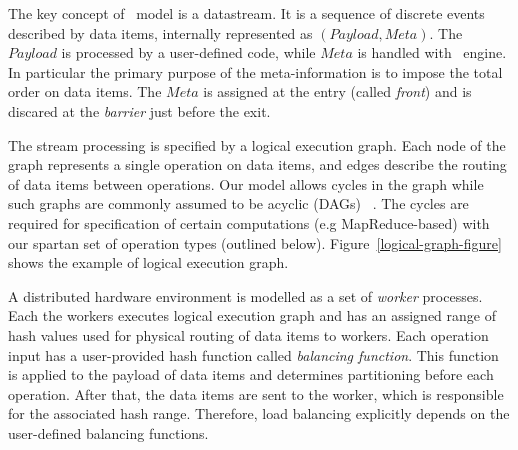 
\label {fs-model}

The key concept of \FlameStream\ model is a datastream. It is a sequence of discrete events described by data items, internally represented as 
$(Payload, Meta).$
The $Payload$ is processed by a user-defined code, while $Meta$ is handled with \FlameStream\ engine. In particular
the primary purpose of the meta-information is to impose the total order on data items. 
The  $Meta$ is assigned at the entry (called {\em  front}) and is discared at the {\em barrier} just before the exit. 

The stream processing is specified by a logical execution graph. 
Each node of the graph represents a single operation on data items, and edges describe the routing of data items between operations.  
Our model allows cycles in the graph while such graphs are commonly assumed to be acyclic (DAGs) 
~\cite{Zaharia:2016:ASU:3013530.2934664, Carbone:2017:SMA:3137765.3137777}. 
The cycles are required for specification of certain computations (e.g MapReduce-based) with our spartan set of operation types (outlined below).
Figure~\ref{logical-graph-figure} shows the example of logical execution graph.

A distributed hardware environment is modelled as a set of {\em worker} processes. 
Each the workers executes logical execution graph and has an assigned range of hash values used for physical routing of data items to workers. 
%
Each operation input has a user-provided hash function called {\it balancing function}. This function is applied to the payload of data items and determines partitioning before each operation. After that, the data items are sent to the worker, which is responsible for the associated hash range. Therefore, load balancing explicitly depends on the user-defined balancing functions. 

